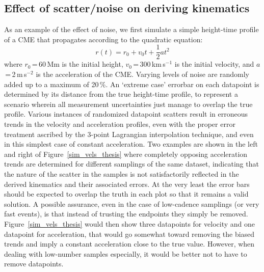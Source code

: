 \documentclass[structabstract]{aa}
\begin{document}
\subsection{Effect of scatter/noise on deriving kinematics}
\label{subsect:test_lagrange_const}


As an example of the effect of noise, we first simulate a simple height-time profile of a CME that propagates according to the quadratic equation:
\begin{equation}
\label{eqn:const_a}
r(t) = r_0 + v_0 t + \frac{1}{2}a t^2
\end{equation}
where $r_0$\,=\,60\,Mm is the initial height, $v_0$\,=\,300\,km\,s$^{-1}$ is the initial velocity, and $a$\,=\,2\,m\,s$^{-2}$ is the acceleration of the CME. Varying levels of noise are randomly added up to a maximum of 20\,\%. An `extreme case' errorbar on each datapoint is determined by its distance from the true height-time profile, to represent a scenario wherein all measurement uncertainties just manage to overlap the true profile. Various instances of randomized datapoint scatters result in erroneous trends in the velocity and acceleration profiles, even with the proper error treatment ascribed by the 3-point Lagrangian interpolation technique, and even in this simplest case of constant acceleration. Two examples are shown in the left and right of Figure~\ref{sim_vels_thesis} where completely opposing acceleration trends are determined for different samplings of the same dataset, indicating that the nature of the scatter in the samples is not satisfactorily reflected in the derived kinematics and their associated errors. At the very least the error bars should be expected to overlap the truth in each plot so that it remains a valid solution. A possible assurance, even in the case of low-cadence samplings (or very fast events), is that instead of trusting the endpoints they simply be removed. Figure~\ref{sim_vels_thesis} would then show three datapoints for velocity and one datapoint for acceleration, that would go somewhat toward removing the biased trends and imply a constant acceleration close to the true value. However, when dealing with low-number samples especially, it would be better not to have to remove datapoints.
\end{document}
